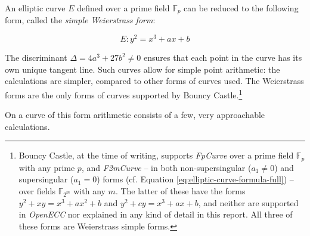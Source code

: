 An elliptic curve \(E\) defined over a prime field \(\mathbb{F}_p\) can be reduced to the following form,
called the \emph{simple Weierstrass form}:

\begin{equation}
	E: y^2 = x^3 + ax + b
\end{equation}

The discriminant \(\Delta = 4a^3 + 27b^2 \neq 0\) ensures that each point in the curve has its own
unique tangent line. Such curves allow for simple point arithmetic: the
calculations are simpler, compared to other forms of curves used. The Weierstrass forms are
the only forms of curves supported by Bouncy Castle.\footnote{Bouncy Castle, at the time of writing,
supports \emph{FpCurve} over a prime field \(\mathbb{F}_p\) with any prime \(p\), and \emph{F2mCurve}
-- in both non-supersingular (\(a_1 \neq 0\)) and supersingular (\(a_1 = 0\)) forms (cf. Equation
\ref{eq:elliptic-curve-formula-full}) -- over fields \(\mathbb{F}_{2^m}\) with any \(m\).
The latter of these have the forms \(y^2 + xy = x^3 + ax^2 + b\) and
\(y^2 + cy = x^3 + ax + b\), and neither are supported in \emph{OpenECC} nor explained in any kind
of detail in this report. All three of these forms are Weierstrass simple forms.\cite{bouncycastle}}

On a curve of this form arithmetic consists of a few, very approachable calculations.
